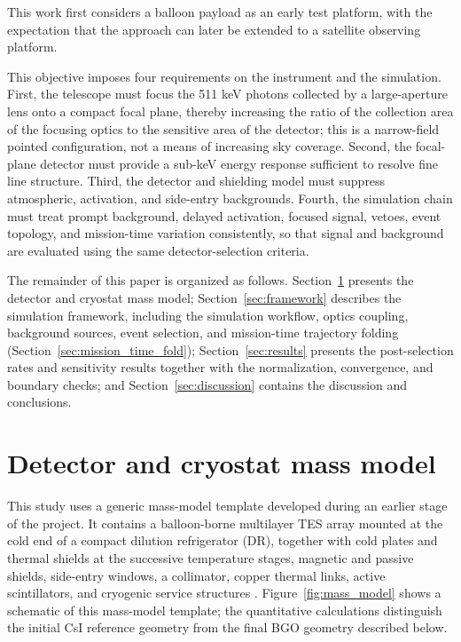 \documentclass[11pt]{article}
\begin{document}
This work first considers a balloon payload as an early test platform, with the
expectation that the approach can later be extended to a satellite observing
platform.

This objective imposes four requirements on the instrument and the simulation.
First, the telescope must focus the 511 keV photons collected by a large-aperture
lens onto a compact focal plane, thereby increasing the ratio of the collection
area of the focusing optics to the sensitive area of the detector; this is a
narrow-field pointed configuration, not a means of increasing sky coverage.
Second, the focal-plane detector must provide a sub-keV energy response
sufficient to resolve fine line structure. Third, the detector and shielding
model must suppress atmospheric, activation, and side-entry backgrounds.
Fourth, the simulation chain must treat prompt background, delayed activation,
focused signal, vetoes, event topology, and mission-time variation consistently,
so that signal and background are evaluated using the same detector-selection
criteria.

The remainder of this paper is organized as follows. Section~\ref{sec:geometry}
presents the detector and cryostat mass model; Section~\ref{sec:framework}
describes the simulation framework, including the simulation workflow, optics
coupling, background sources, event selection, and mission-time trajectory
folding (Section~\ref{sec:mission_time_fold}); Section~\ref{sec:results} presents
the post-selection rates and sensitivity results together with the
normalization, convergence, and boundary checks; and
Section~\ref{sec:discussion} contains the discussion and conclusions.

\endgroup

\section{Detector and cryostat mass model}
\label{sec:geometry}

This study uses a generic mass-model template developed during an earlier stage
of the project. It contains a balloon-borne multilayer TES array mounted at the
cold end of a compact dilution refrigerator (DR), together with cold plates and
thermal shields at the successive temperature stages, magnetic and passive
shields, side-entry windows, a collimator, copper thermal links, active
scintillators, and cryogenic service structures
\cite{Shirazi2023,Gottardi2021TESReview}. Figure~\ref{fig:mass_model} shows a
schematic of this mass-model template; the quantitative calculations distinguish
the initial CsI reference geometry from the final BGO geometry described below.
\end{document}
